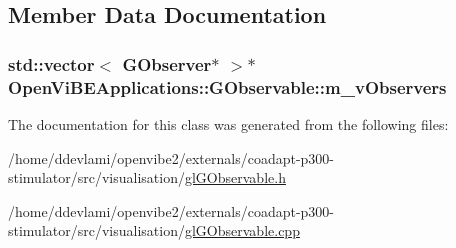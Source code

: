 \subsection{Member Data Documentation}
\hypertarget{classOpenViBEApplications_1_1GObservable_a294f95145fbb2ac73c7139f23589851c}{
\subsubsection[{m\_\-vObservers}]{\setlength{\rightskip}{0pt plus 5cm}std::vector$<$ {\bf GObserver}$\ast$ $>$$\ast$ {\bf OpenViBEApplications::GObservable::m\_\-vObservers}}}
\label{classOpenViBEApplications_1_1GObservable_a294f95145fbb2ac73c7139f23589851c}


The documentation for this class was generated from the following files:\begin{DoxyCompactItemize}
\item 
/home/ddevlami/openvibe2/externals/coadapt-\/p300-\/stimulator/src/visualisation/\hyperlink{glGObservable_8h}{glGObservable.h}\item 
/home/ddevlami/openvibe2/externals/coadapt-\/p300-\/stimulator/src/visualisation/\hyperlink{glGObservable_8cpp}{glGObservable.cpp}\end{DoxyCompactItemize}
